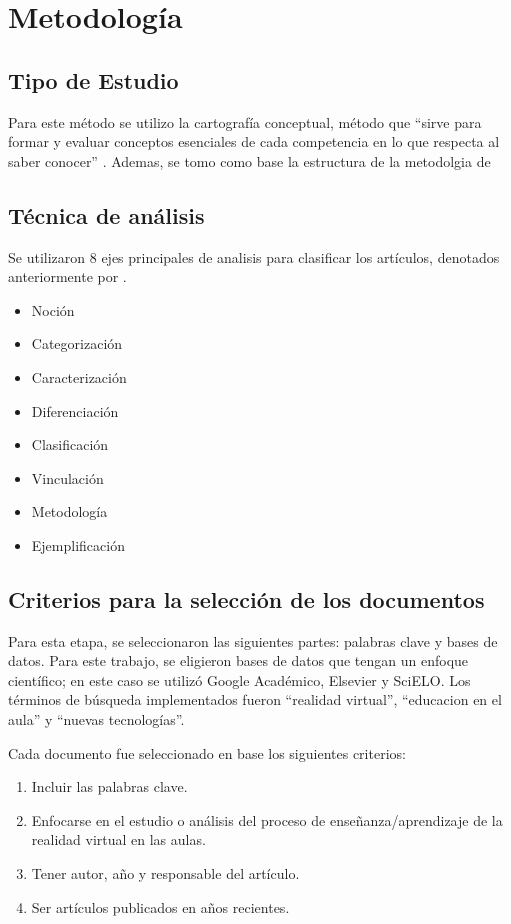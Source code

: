 \section{Metodología}
\subsection{Tipo de Estudio}
Para este método se utilizo la cartografía conceptual, método que “sirve para formar y evaluar conceptos esenciales de cada competencia en lo que respecta al saber conocer” \parencite[][p. 16]{tobon2012}. Ademas, se tomo como base la estructura de la metodolgia de \textcite{guzman2020} 
\subsection{Técnica de análisis}
Se utilizaron 8 ejes principales de analisis para clasificar los artículos, denotados anteriormente por \textcite{tobon2012} .
\begin{itemize}
   \item Noción
   \item Categorización
   \item Caracterización
   \item Diferenciación
   \item Clasificación
   \item Vinculación
   \item Metodología
   \item Ejemplificación
\end{itemize}



\subsection{Criterios para la selección de los documentos}

Para esta etapa, se seleccionaron las siguientes partes: palabras clave y bases de datos. Para este trabajo, se eligieron bases de datos que tengan un enfoque científico; en este caso se utilizó Google Académico, Elsevier y SciELO. Los términos de búsqueda implementados fueron “realidad virtual”, “educacion en el aula” y “nuevas tecnologías”.

Cada documento fue seleccionado en base los siguientes criterios:

\begin{enumerate}
   \item Incluir las palabras clave.
   \item Enfocarse en el estudio o análisis del proceso de enseñanza/aprendizaje de la realidad virtual en las aulas.
   \item Tener autor, año y responsable del artículo.
   \item Ser artículos publicados en años recientes.
\end{enumerate}


